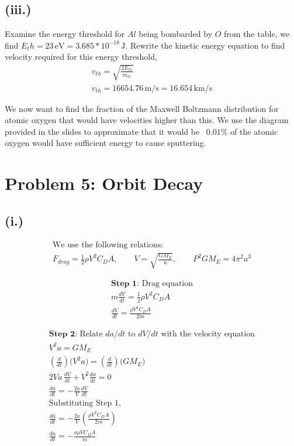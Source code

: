 \documentclass[11pt]{article}
\begin{document}
\subsection*{(iii.)}
\hspace*{2em}Examine the energy threshold for $Al$ being bombarded by $O$ from
the table, we find $E_th = 23\,\mathrm{eV} = 3.685*10^{-18}\,\mathrm{J}$. Rewrite
the kinetic energy equation to find velocity required for this energy threshold,
\[
\begin{gathered}
v_{th} = \sqrt{\frac{2 E_{th}}{m_O}} \\
v_{th} = 16654.76 \, \mathrm{m/s} = 16.654\,\mathrm{km/s}
\end{gathered}
\]

\hspace*{2em}We now want to find the fraction of the Maxwell Boltzmann distribution
for atomic oxygen that would have velocities higher than this. We use the diagram provided in
the slides to approximate that it would be ~$0.01\%$ of the atomic oxygen would have sufficient energy
to cause sputtering. 

\newpage
\section*{Problem 5: Orbit Decay}
\subsection*{(i.)}
\[
\begin{gathered}
\text{We use the following relations:} \\
F_{drag} = \frac{1}{2} \rho V^2 C_D A, \qquad
V = \sqrt{\frac{G M_E}{a}}, \qquad
P^2 G M_E = 4 \pi^2 a^3
\end{gathered}
\]

\[
\begin{gathered}
\textbf{Step 1:} \text{ Drag equation} \\
m \frac{dV}{dt} = \frac{1}{2} \rho V^2 C_D A \\
\frac{dV}{dt} = \frac{\rho V^2 C_D A}{2m}
\end{gathered}
\]

\[
\begin{gathered}
\textbf{Step 2:} \text{ Relate } da/dt \text{ to } dV/dt \text{ with the velocity equation} \\
V^2 a = G M_E \\
\left(\frac{d}{dt}\right)\Big(V^2 a\Big) = \left(\frac{d}{dt}\right)\Big(G M_E\Big) \\
2Va\,\frac{dV}{dt} + V^2 \frac{da}{dt} = 0 \\
\frac{da}{dt} = -\frac{2a}{V}\frac{dV}{dt} \\
\text{Substituting Step 1,} \\
\frac{da}{dt} = -\frac{2a}{V}\left(\frac{\rho V^2 C_D A}{2m}\right) \\
\frac{da}{dt} = -\frac{a \rho V C_D A}{m}
\end{gathered}
\]
\end{document}
